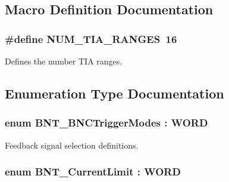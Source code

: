 \subsection{Macro Definition Documentation}
\subsubsection[{\texorpdfstring{N\+U\+M\+\_\+\+T\+I\+A\+\_\+\+R\+A\+N\+G\+ES}{NUM_TIA_RANGES}}]{\setlength{\rightskip}{0pt plus 5cm}\#define N\+U\+M\+\_\+\+T\+I\+A\+\_\+\+R\+A\+N\+G\+ES~16}\hypertarget{group___benchtop_nano_trak_ga71c4ccd426f774dbc92d38deb456bdb1}{}\label{group___benchtop_nano_trak_ga71c4ccd426f774dbc92d38deb456bdb1}


Defines the number T\+IA ranges. 



\subsection{Enumeration Type Documentation}
\subsubsection[{\texorpdfstring{B\+N\+T\+\_\+\+B\+N\+C\+Trigger\+Modes}{BNT_BNCTriggerModes}}]{\setlength{\rightskip}{0pt plus 5cm}enum {\bf B\+N\+T\+\_\+\+B\+N\+C\+Trigger\+Modes} \+: W\+O\+RD}\hypertarget{group___benchtop_nano_trak_gafcd5eb62b69ae1842a900947e0d1aac3}{}\label{group___benchtop_nano_trak_gafcd5eb62b69ae1842a900947e0d1aac3}


Feedback signal selection definitions. 

\subsubsection[{\texorpdfstring{B\+N\+T\+\_\+\+Current\+Limit}{BNT_CurrentLimit}}]{\setlength{\rightskip}{0pt plus 5cm}enum {\bf B\+N\+T\+\_\+\+Current\+Limit} \+: W\+O\+RD}\hypertarget{group___benchtop_nano_trak_ga7749f98a6108f8dec37d05130cfdd1d3}{}\label{group___benchtop_nano_trak_ga7749f98a6108f8dec37d05130cfdd1d3}


